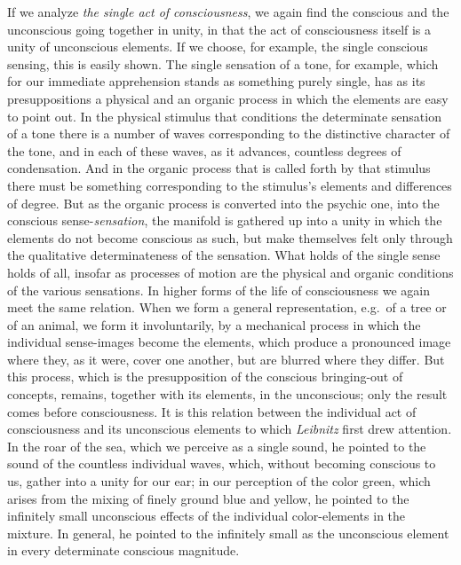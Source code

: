 \documentclass[12pt,a4paper,openany]{book}
\newcommand{\opage}[1]{\marginnote{\footnotesize\textit{[#1]}}}
\begin{document}
If we analyze \emph{the single act of consciousness}, we again find
the conscious and the unconscious going together in unity, in that the
act of consciousness itself is a unity of unconscious elements. If we
choose, for example, the single conscious sensing, this is easily
shown. The single sensation of a tone, for example, which for our
immediate apprehension stands as something purely single, has as its
presuppositions a physical and an organic process in which the elements
are easy to point out. In the physical stimulus that conditions the
determinate sensation of a tone there is a number of waves corresponding
to the distinctive character of the tone, and in each of these waves,
as it advances, countless degrees of condensation. And in the organic
process that is called forth by that stimulus there must be something
corresponding to the stimulus's elements and differences of degree.
But as the organic process is converted into the psychic one, into the
conscious sense-\emph{sensation}, the manifold is gathered up into a
unity in which the elements do not become conscious as such, but make
themselves felt only through the qualitative determinateness of the
sensation. What holds of the single sense holds of all, insofar as
processes of motion are the physical and organic conditions of the
various sensations. In higher
\opage{50}forms of the life of consciousness we again meet the same relation.
When we form a general representation, e.g.\ of a tree or of an
animal, we form it involuntarily, by a mechanical process in which
the individual sense-images become the elements, which produce a
pronounced image where they, as it were, cover one another, but are
blurred where they differ. But this process, which is the
presupposition of the conscious bringing-out of concepts, remains,
together with its elements, in the unconscious; only the result comes
before consciousness. It is this relation between the individual act
of consciousness and its unconscious elements to which \emph{Leibnitz}
first drew attention. In the roar of the sea, which we perceive as a
single sound, he pointed to the sound of the countless individual
waves, which, without becoming conscious to us, gather into a unity
for our ear; in our perception of the color green, which arises from
the mixing of finely ground blue and yellow, he pointed to the
infinitely small unconscious effects of the individual color-elements
in the mixture. In general, he pointed to the infinitely small as the
unconscious element in every determinate conscious magnitude.
\end{document}
